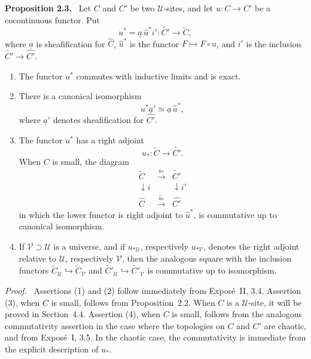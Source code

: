 \documentclass[11pt]{article}
\newcommand{\U}{\mathcal{U}}
\newcommand{\V}{\mathcal{V}}
\newenvironment{statement}[1]{\par\medskip\noindent\textbf{#1.}\ }{\par\medskip}
\newenvironment{prooftext}{\par\noindent\emph{Proof.}\ }{\par\medskip}
\begin{document}
\begin{statement}{Proposition 2.3}
Let \(C\) and \(C'\) be two \(\U\)-sites, and let \(u:C\to C'\) be a cocontinuous functor. Put
\[
u^*=\underline a\,\widehat u^*i':\widetilde{C'}\to\widetilde C,
\]
where \(\underline a\) is sheafification for \(\widehat C\), \(\widehat u^*\) is the functor \(F\mapsto F\circ u\), and \(i'\) is the inclusion \(\widetilde{C'}\to\widehat{C'}\).
\begin{enumerate}[label=\arabic*)]
\item The functor \(u^*\) commutes with inductive limits and is exact.
\item There is a canonical isomorphism
\[
u^*\underline a'\simeq\underline a\,\widehat u^*,
\]
where \(\underline a'\) denotes sheafification for \(\widehat{C'}\).
\item The functor \(u^*\) has a right adjoint
\[
u_*:\widetilde C\to\widetilde{C'}.
\]
When \(C\) is small, the diagram
\[
\begin{array}{ccc}
\widetilde C&\xrightarrow{u_*}&\widetilde{C'}\\
\downarrow i&&\downarrow i'\\
\widehat C&\xrightarrow{\widehat u_*}&\widehat{C'}
\end{array}\tag{2.3.1}
\]
in which the lower functor is right adjoint to \(\widehat u^*\), is commutative up to canonical isomorphism.
\item If \(\V\supset\U\) is a universe, and if \(u_{*\U}\), respectively \(u_{*\V}\), denotes the right adjoint relative to \(\U\), respectively \(\V\), then the analogous square with the inclusion functors \(\widetilde C_\U\hookrightarrow\widetilde C_\V\) and \(\widetilde{C'}_\U\hookrightarrow\widetilde{C'}_\V\) is commutative up to isomorphism.
\end{enumerate}
\end{statement}

\begin{prooftext}
Assertions (1) and (2) follow immediately from Expos\'e~II, 3.4. Assertion (3), when \(C\) is small, follows from Proposition~2.2. When \(C\) is a \(\U\)-site, it will be proved in Section~4.4. Assertion (4), when \(C\) is small, follows from the analogous commutativity assertion in the case where the topologies on \(C\) and \(C'\) are chaotic, and from Expos\'e~I, 3.5. In the chaotic case, the commutativity is immediate from the explicit description of \(u_*\).
\end{prooftext}
\end{document}
